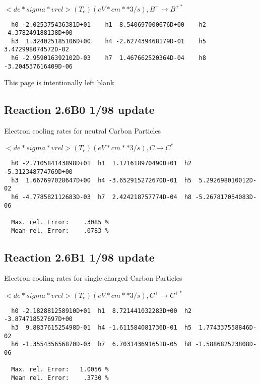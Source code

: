 \documentclass[12pt]{article}
\begin{document}
 $<de*sigma*vrel>(T_e)  (eV*cm**3/s), B^+ \rightarrow B^{+*} $


\begin{small}\begin{verbatim}
  h0 -2.025375436381D+01    h1  8.540697000676D+00    h2 -4.378249188138D+00
  h3  1.324025185106D+00    h4 -2.627439468179D-01    h5  3.472998074572D-02
  h6 -2.959016392102D-03    h7  1.467662520364D-04    h8 -3.204537616409D-06
\end{verbatim}\end{small}

\newpage
This page is intentionally left blank
\newpage

\subsection{
Reaction 2.6B0                     1/98 update
}

 Electron cooling rates for neutral
 Carbon Particles

$ <de*sigma*vrel>(T_e)  (eV*cm**3/s), C   \rightarrow C^* $


\begin{small}\begin{verbatim}
  h0 -2.710584143898D+01  h1  1.171618970490D+01  h2 -5.312348774769D+00
  h3  1.667697028647D+00  h4 -3.652915272670D-01  h5  5.292698010012D-02
  h6 -4.778582112683D-03  h7  2.424218757774D-04  h8 -5.267817054083D-06

  Max. rel. Error:    .3085 %
  Mean rel. Error:    .0783 %

\end{verbatim}\end{small}

\subsection{
Reaction 2.6B1                     1/98 update
}

 Electron cooling rates for single
 charged Carbon Particles

 $<de*sigma*vrel>(T_e)  (eV*cm**3/s), C^+ \rightarrow C^{+*} $


\begin{small}\begin{verbatim}
  h0 -2.182881258910D+01  h1  8.721441032283D+00  h2 -3.874718527697D+00
  h3  9.883761525498D-01  h4 -1.611584081736D-01  h5  1.774337558846D-02
  h6 -1.355435656870D-03  h7  6.703143691651D-05  h8 -1.588682523808D-06

  Max. rel. Error:   1.0056 %
  Mean rel. Error:    .3730 %

\end{verbatim}\end{small}
\end{document}
